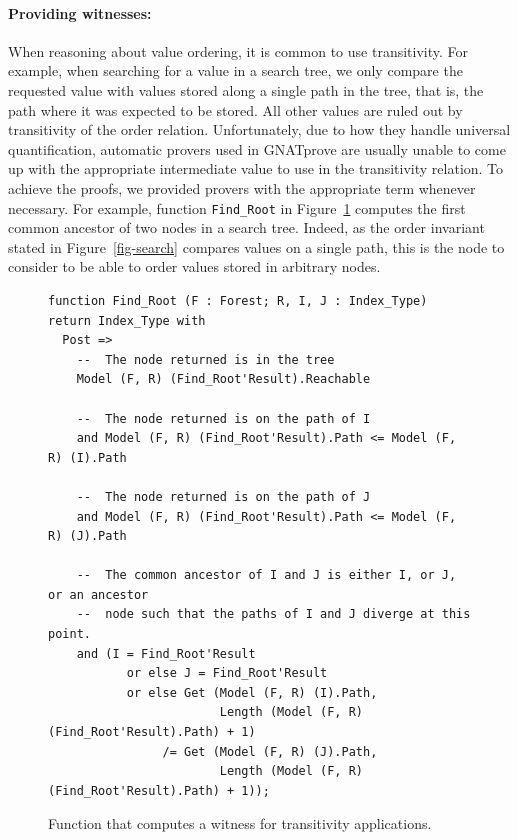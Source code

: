 \documentclass{llncs}
\newcommand{\gnatprove}{GNATprove\xspace}
\begin{document}
\paragraph{Providing witnesses:}
When reasoning about value ordering, it is common to use transitivity. For example, when searching for
a value in a search tree, we only compare the requested value with values stored along a single path in
the tree, that is, the path where it was expected to be stored. All other values are ruled out by
transitivity of the order relation. Unfortunately, due to how they handle universal quantification,
automatic provers used in \gnatprove are usually unable to come up with the appropriate
intermediate value to use in the transitivity relation. To achieve the proofs, we provided
provers with the appropriate term whenever necessary. For example, function \texttt{Find\_Root} in
Figure~\ref{fig-proof-wit} computes the first common ancestor of two nodes in a search tree. Indeed, as
the order invariant stated in Figure~\ref{fig-search} compares values on a single path, this
is the node to consider to be able to order values stored in arbitrary nodes.

\begin{figure}
\begin{small}
\begin{lstlisting}
function Find_Root (F : Forest; R, I, J : Index_Type) return Index_Type with
  Post =>
    --  The node returned is in the tree
    Model (F, R) (Find_Root'Result).Reachable

    --  The node returned is on the path of I
    and Model (F, R) (Find_Root'Result).Path <= Model (F, R) (I).Path

    --  The node returned is on the path of J
    and Model (F, R) (Find_Root'Result).Path <= Model (F, R) (J).Path

    --  The common ancestor of I and J is either I, or J, or an ancestor
    --  node such that the paths of I and J diverge at this point.
    and (I = Find_Root'Result
           or else J = Find_Root'Result
           or else Get (Model (F, R) (I).Path,
                        Length (Model (F, R) (Find_Root'Result).Path) + 1)
                /= Get (Model (F, R) (J).Path,
                        Length (Model (F, R) (Find_Root'Result).Path) + 1));
\end{lstlisting}
\end{small}
\caption{\label{fig-proof-wit} Function that computes a witness for transitivity applications.}
\end{figure}
\end{document}
